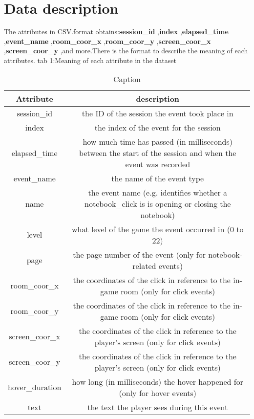 \documentclass{article}
\begin{document}
\section{Data description}
    The attributes in CSV.format obtains:\textbf{session\_id} ,\textbf{index} ,\textbf{elapsed\_time} ,\textbf{event\_name} ,\textbf{room\_coor\_x} ,\textbf{room\_coor\_y} ,\textbf{screen\_coor\_x}  ,\textbf{screen\_coor\_y} ,and more.There is the format to describe the meaning of each attributes.
    tab 1:Meaning of each attribute in the dataset
    \begin{table}
        \centering
\caption{Caption}
\label{tab:my_label}
        \begin{tabular}{|c|c|} \hline 
             Attribute& description\\ \hline 
             session_id& the ID of the session the event took place in\\ \hline 
             index&  the index of the event for the session\\ \hline 
             elapsed_time& how much time has passed (in milliseconds) between the start of the session and when the event was recorded\\ \hline 
             event_name&  the name of the event type\\ \hline 
             name &  the event name (e.g. identifies whether a notebook_click is is opening or closing the notebook)\\ \hline 
             level & what level of the game the event occurred in (0 to 22)\\ \hline 
             page&  the page number of the event (only for notebook-related events)\\ \hline 
             room_coor_x& the coordinates of the click in reference to the in-game room (only for click events)\\ \hline 
             room_coor_y& the coordinates of the click in reference to the in-game room (only for click events)\\ \hline
 screen_coor_x&the coordinates of the click in reference to the player’s screen (only for click events)\\\hline
 screen_coor_y &the coordinates of the click in reference to the player’s screen (only for click events)\\\hline
 hover_duration&how long (in milliseconds) the hover happened for (only for hover events)\\\hline
 text& the text the player sees during this event\\\hline

\end{tabular}
\end{table}
\end{document}
